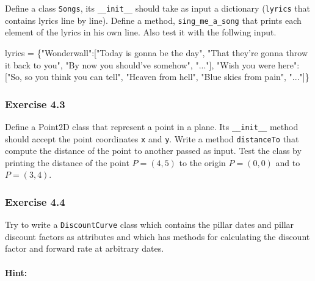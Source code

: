 \documentclass[11pt]{article}
\newenvironment{Shaded}{}{}
\newcommand{\StringTok}[1]{\textcolor[rgb]{0.25,0.44,0.63}{{#1}}}
\newcommand{\NormalTok}[1]{{#1}}
\newcommand{\OperatorTok}[1]{\textcolor[rgb]{0.40,0.40,0.40}{{#1}}}
\begin{document}
Define a class \texttt{Songs}, its \texttt{\_\_init\_\_} should take as
input a dictionary (\texttt{lyrics} that contains lyrics line by line).
Define a method, \texttt{sing\_me\_a\_song} that prints each element of
the lyrics in his own line. Also test it with the follwing input.

\begin{Shaded}
\begin{Highlighting}[]
\NormalTok{lyrics }\OperatorTok{=}\NormalTok{ \{}\StringTok{"Wonderwall"}\NormalTok{:[}\StringTok{"Today is gonna be the day"}\NormalTok{,}
                        \StringTok{"That they're gonna throw it back to you"}\NormalTok{,}
                        \StringTok{"By now you should've somehow"}\NormalTok{, }\StringTok{"..."}\NormalTok{], }
          \StringTok{"Wish you were here"}\NormalTok{:  [}\StringTok{"So, so you think you can tell"}\NormalTok{,}
                                  \StringTok{"Heaven from hell"}\NormalTok{,}
                                   \StringTok{"Blue skies from pain"}\NormalTok{, }\StringTok{"..."}\NormalTok{]\}}
\end{Highlighting}
\end{Shaded}

\hypertarget{exercise-4.3}{%
\subsubsection{Exercise 4.3}\label{exercise-4.3}}

Define a Point2D class that represent a point in a plane. Its
\texttt{\_\_init\_\_} method should accept the point coordinates
\texttt{x} and \texttt{y}. Write a method \texttt{distanceTo} that
compute the distance of the point to another passed as input. Test the
class by printing the distance of the point \(P=(4, 5)\) to the origin
\(P=(0,0)\) and to \(P=(3,4)\).

\hypertarget{exercise-4.4}{%
\subsubsection{Exercise 4.4}\label{exercise-4.4}}

Try to write a \texttt{DiscountCurve} class which contains the pillar
dates and pillar discount factors as attributes and which has methods
for calculating the discount factor and forward rate at arbitrary dates.

\hypertarget{hint}{%
\paragraph{Hint:}\label{hint}}
\end{document}
